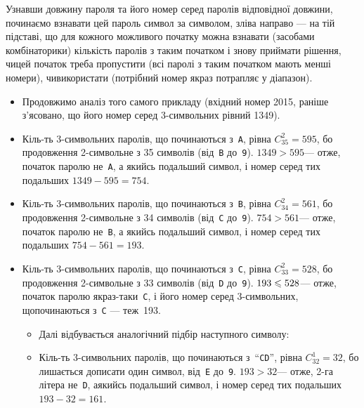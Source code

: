 \documentclass[14pt,a4paper]{extarticle}
\begin{document}
Узнавши довжину пароля та його номер серед паролів 
відповідної довжини, починаємо взнавати цей пароль символ за символом, зліва направо --- на тій підставі, що для кожного можливого початку можна взнавати (засобами комбінаторики) 
кількість паролів з таким початком і знову приймати рішення, чи\nolinebreak[3] цей початок треба пропустити (всі паролі з таким початком мають менші номери), чи\nolinebreak[3] використати (потрібний номер якраз потрапляє у діапазон).

\begin{small}
\begin{itemize}
\item[] Продовжимо аналіз того самого прикладу (вхідний номер 2015, раніше з’ясовано, що його номер серед 3-символьних рівний 1349).

\item Кіль-ть 3-символьних паролів, що починаються з~\texttt{A}, рівна ${C_{35}^2 = 595}$, бо продовження %
2-символьне з 35 символів (від~\texttt{B} до~\texttt{9}). ${1349>595}$\nolinebreak[3] --- отже, початок паролю не~\texttt{A}, а якийсь подальший символ, і номер %
серед тих подальших ${1349-595=754}$.

\item Кіль-ть 3-символьних паролів, що починаються з~\texttt{B}, рівна ${C_{34}^2 = 561}$, бо продовження %
2-символьне з 34 символів (від~\texttt{C} до~\texttt{9}). ${754>561}$\nolinebreak[3] --- отже, початок паролю не~\texttt{B}, а якийсь подальший символ, і номер %
серед тих подальших ${754-561=193}$.

\item Кіль-ть 3-символьних паролів, що починаються з~\texttt{C}, рівна ${C_{33}^2 = 528}$, бо продовження %
2-символьне з 33 символів (від~\texttt{D} до~\texttt{9}). ${193\leqslant528}$\nolinebreak[3] --- отже, початок паролю якраз-таки~\texttt{C}, і його номер серед 3-символьних, що\nolinebreak[3] починаються з~\texttt{C} --- теж~193.

\begin{itemize}
\item[] Далі відбувається аналогічний підбір наступного символу:

\item[\textopenbullet] Кіль-ть 3-символьних паролів, що починаються з~``\texttt{CD}'', рівна ${C_{32}^1=32}$, бо лишається дописати один символ, від~\texttt{E} до~\texttt{9}. ${193>32}$\nolinebreak[3] --- отже, 2-га літера не~\texttt{D}, а\nolinebreak[3] якийсь подальший символ, і номер %
серед тих подальших ${193-32=161}$.


\end{itemize}
\end{itemize}
\end{small}
\end{document}
